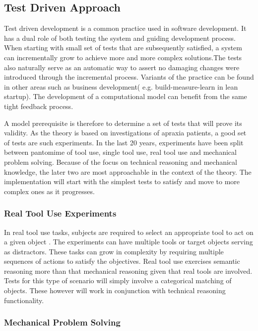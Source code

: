 \documentclass[11]{article}
\begin{document}
\subsection*{Test Driven Approach}

Test driven development is a common practice used in software development. It has a dual role of both testing the system and guiding development process. When starting with small set of tests that are subsequently satisfied, a system can incrementally grow to achieve more and more complex solutions.The tests also naturally serve as an automatic way to assert no damaging changes were introduced through the incremental process. Variants of the practice can be found in other areas such as business development( e.g. build-measure-learn in lean startup\cite{rise2011}). The development of a computational model can benefit from the same tight feedback process.

A model prerequisite is therefore to determine a set of tests that will prove its validity. As the theory is based on investigations of apraxia patients, a good set of tests are such experiments. In the last 20 years, experiments have been split between pantomime of tool use, single tool use, real tool use and mechanical problem solving\cite{baumard2014}. Because of the focus on technical reasoning and mechanical knowledge, the later two are most approachable in the context of the theory. The implementation will start with the simplest tests to satisfy and move to more complex ones as it progresses.

\subsubsection*{Real Tool Use Experiments}

In real tool use tasks, subjects are required to select an appropriate tool to act on a given object \cite{baumard2014}. The experiments can have multiple tools or target objects serving as distractors. These tasks can grow in complexity by requiring multiple sequences of actions to satisfy the objectives. Real tool use exercises semantic reasoning more than that mechanical reasoning given that real tools are involved. Tests for this type of scenario will simply involve a categorical matching of objects. These however will work in conjunction with technical reasoning functionality.

\subsubsection*{Mechanical Problem Solving}
\end{document}
